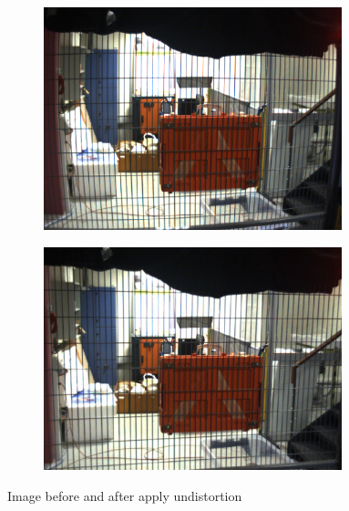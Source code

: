 	\begin{figure}[htb]
		\centering
		\begin{subfigure}{.49\textwidth}
		  \centering
		  \includegraphics[width=0.95\textwidth]{figures/distorted}
		\end{subfigure}%
		\begin{subfigure}{.49\textwidth}
		  \centering
		  \includegraphics[width=0.95\textwidth]{figures/undistorted}
		\end{subfigure}
		\caption{Image before and after apply undistortion}
		\label{fig:undistorsion}
	\end{figure}


